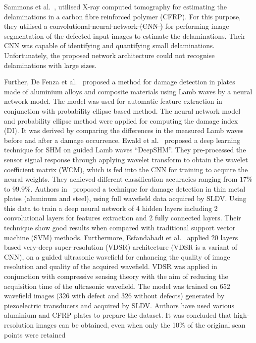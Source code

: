 \documentclass[preprint,9pt]{elsarticle}
\providecommand{\DIFaddtex}[1]{{\protect\color{blue}\uwave{#1}}} %
\providecommand{\DIFdeltex}[1]{{\protect\color{red}\sout{#1}}}                      %
\providecommand{\DIFaddbegin}{} %
\providecommand{\DIFaddend}{} %
\providecommand{\DIFdelbegin}{} %
\providecommand{\DIFdelend}{} %
\providecommand{\DIFadd}[1]{\texorpdfstring{\DIFaddtex{#1}}{#1}} %
\providecommand{\DIFdel}[1]{\texorpdfstring{\DIFdeltex{#1}}{}} %
\newcommand{\DIFscaledelfig}{0.5}
\newlength{\DIFdelgraphicswidth} %
\newlength{\DIFdelgraphicsheight} %
\newcommand{\DIFaddincludegraphics}[2][]{{\color{blue}\fbox{\DIFOincludegraphics[#1]{#2}}}} %
\newcommand{\DIFdelincludegraphics}[2][]{%
\sbox{\DIFdelgraphicsbox}{\DIFOincludegraphics[#1]{#2}}%
\settoboxwidth{\DIFdelgraphicswidth}{\DIFdelgraphicsbox} %
\settoboxtotalheight{\DIFdelgraphicsheight}{\DIFdelgraphicsbox} %
\scalebox{\DIFscaledelfig}{%
\parbox[b]{\DIFdelgraphicswidth}{\usebox{\DIFdelgraphicsbox}\\[-\baselineskip] \rule{\DIFdelgraphicswidth}{0em}}\llap{\resizebox{\DIFdelgraphicswidth}{\DIFdelgraphicsheight}{%
\setlength{\unitlength}{\DIFdelgraphicswidth}%
\begin{picture}(1,1)%
\thicklines\linethickness{2pt} %
{\color[rgb]{1,0,0}\put(0,0){\framebox(1,1){}}}%
{\color[rgb]{1,0,0}\put(0,0){\line( 1,1){1}}}%
{\color[rgb]{1,0,0}\put(0,1){\line(1,-1){1}}}%
\end{picture}%
}\hspace*{3pt}}} %
} %
\DeclareRobustCommand{\DIFaddbegin}{\DIFOaddbegin \let\includegraphics\DIFaddincludegraphics} %
\DeclareRobustCommand{\DIFaddend}{\DIFOaddend \let\includegraphics\DIFOincludegraphics} %
\DeclareRobustCommand{\DIFdelbegin}{\DIFOdelbegin \let\includegraphics\DIFdelincludegraphics} %
\DeclareRobustCommand{\DIFdelend}{\DIFOaddend \let\includegraphics\DIFOincludegraphics} %
\begin{document}
Sammons et al.~\cite{sammons2016segmenting}, utilised X-ray computed tomography for estimating the delaminations in a carbon fibre reinforced polymer (CFRP). 
For this purpose, they utilised a \DIFdelbegin \DIFdel{convolutional neural network (CNN ) }\DIFdelend \DIFaddbegin \DIFadd{CNN }\DIFaddend for performing image segmentation of the defected input images to estimate the delaminations. 
Their CNN was capable of identifying and quantifying small delaminations. 
Unfortunately, the proposed network architecture could not recognise delaminations with large sizes.

Further, De Fenza et al.~\cite{de2015application} proposed a method for damage detection in plates made of aluminium alloys and composite materials using Lamb waves by a neural network model.
The model was used for automatic feature extraction in conjunction with probability ellipse based method. 
The neural network model and probability ellipse method were applied for computing the damage index (DI). 
It was derived by comparing the differences in the measured  Lamb waves before and after a damage occurrence. 
Ewald et al.~\cite{ewald2019deepshm} proposed a deep learning technique for SHM on guided Lamb waves \enquote{DeepSHM}. 
They pre-processed the sensor signal response through applying wavelet transform to obtain the wavelet coefficient matrix (WCM), which is fed into the CNN for training to acquire the neural weights. 
They achieved different classification accuracies ranging from \(17\%\) to \(99.9\%\).
Authors in~\cite{Melville2018} proposed a technique for damage detection in thin metal plates (aluminum and steel), using full wavefield data acquired by SLDV. 
Using this data to train a deep neural network of 4 hidden layers including 2 convolutional layers for features extraction and 2 fully connected layers. 
Their technique show good results when compared with traditional support vector machine (SVM) methods.
Furthermore, Esfandabadi et al.~\cite{esfandabadideep} applied 20 layers based very-deep super-resolution (VDSR) architecture (VDSR is a variant of CNN), on a guided ultrasonic wavefield for enhancing the quality of image resolution and quality of the acquired wavefield. 
VDSR was applied in conjunction with compressive sensing theory with the aim of reducing the acquisition time of the ultrasonic wavefield.
The model was trained on \(652\) wavefield images (\(326\) with defect and \(326\) without defects) generated by piezoelectric transducers and acquired by SLDV. 
Authors have used various aluminium and CFRP plates to prepare the dataset.
It was concluded that high-resolution images can be obtained, even when only the 10\% of the original scan points were retained
\end{document}
